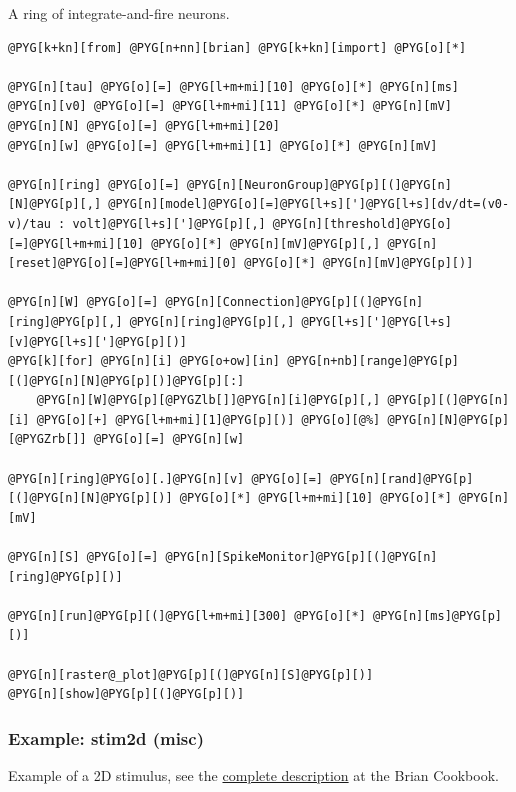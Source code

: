 \documentclass[letterpaper,10pt,english]{manual}
\begin{document}
A ring of integrate-and-fire neurons.

\begin{Verbatim}[commandchars=@\[\]]
@PYG[k+kn][from] @PYG[n+nn][brian] @PYG[k+kn][import] @PYG[o][*]

@PYG[n][tau] @PYG[o][=] @PYG[l+m+mi][10] @PYG[o][*] @PYG[n][ms]
@PYG[n][v0] @PYG[o][=] @PYG[l+m+mi][11] @PYG[o][*] @PYG[n][mV]
@PYG[n][N] @PYG[o][=] @PYG[l+m+mi][20]
@PYG[n][w] @PYG[o][=] @PYG[l+m+mi][1] @PYG[o][*] @PYG[n][mV]

@PYG[n][ring] @PYG[o][=] @PYG[n][NeuronGroup]@PYG[p][(]@PYG[n][N]@PYG[p][,] @PYG[n][model]@PYG[o][=]@PYG[l+s][']@PYG[l+s][dv/dt=(v0-v)/tau : volt]@PYG[l+s][']@PYG[p][,] @PYG[n][threshold]@PYG[o][=]@PYG[l+m+mi][10] @PYG[o][*] @PYG[n][mV]@PYG[p][,] @PYG[n][reset]@PYG[o][=]@PYG[l+m+mi][0] @PYG[o][*] @PYG[n][mV]@PYG[p][)]

@PYG[n][W] @PYG[o][=] @PYG[n][Connection]@PYG[p][(]@PYG[n][ring]@PYG[p][,] @PYG[n][ring]@PYG[p][,] @PYG[l+s][']@PYG[l+s][v]@PYG[l+s][']@PYG[p][)]
@PYG[k][for] @PYG[n][i] @PYG[o+ow][in] @PYG[n+nb][range]@PYG[p][(]@PYG[n][N]@PYG[p][)]@PYG[p][:]
    @PYG[n][W]@PYG[p][@PYGZlb[]]@PYG[n][i]@PYG[p][,] @PYG[p][(]@PYG[n][i] @PYG[o][+] @PYG[l+m+mi][1]@PYG[p][)] @PYG[o][@%] @PYG[n][N]@PYG[p][@PYGZrb[]] @PYG[o][=] @PYG[n][w]

@PYG[n][ring]@PYG[o][.]@PYG[n][v] @PYG[o][=] @PYG[n][rand]@PYG[p][(]@PYG[n][N]@PYG[p][)] @PYG[o][*] @PYG[l+m+mi][10] @PYG[o][*] @PYG[n][mV]

@PYG[n][S] @PYG[o][=] @PYG[n][SpikeMonitor]@PYG[p][(]@PYG[n][ring]@PYG[p][)]

@PYG[n][run]@PYG[p][(]@PYG[l+m+mi][300] @PYG[o][*] @PYG[n][ms]@PYG[p][)]

@PYG[n][raster@_plot]@PYG[p][(]@PYG[n][S]@PYG[p][)]
@PYG[n][show]@PYG[p][(]@PYG[p][)]
\end{Verbatim}

\resetcurrentobjects
\hypertarget{--doc-examples-misc_stim2d}{}

\hypertarget{index-66}{}\subsubsection{Example: stim2d (misc)}

Example of a 2D stimulus, see the
\href{http://neuralensemble.org/cookbook/wiki/Brian/StimulusArrayGroup}{complete description}
at the Brian Cookbook.
\end{document}
